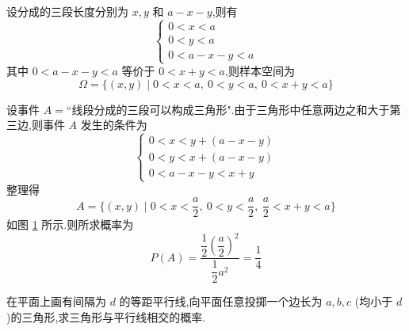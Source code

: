 \begin{solution}
    设分成的三段长度分别为 $x, y$ 和 $a-x-y$,则有
    $$
    \begin{cases}
        0<x<a \\
        0<y<a \\
        0 < a-x-y < a
    \end{cases}
    $$
    其中 $0 < a-x-y < a$ 等价于 $0 < x+y < a$,则样本空间为
    $$
    \varOmega = \{ (x,y) \mid 0<x<a,\ 0<y<a,\ 0 < x+y < a \}
    $$

    设事件 $A = \text{``线段分成的三段可以构成三角形"}$.由于三角形中任意两边之和大于第三边,则事件 $A$ 发生的条件为
    $$
    \begin{cases}
        0 < x < y + (a-x-y) \\
        0 < y < x + (a-x-y) \\
        0 < a-x-y < x+y
    \end{cases}
    $$
    整理得
    $$
    A = \{ (x,y) \mid 0 < x < \dfrac{a}{2},\ 0 < y < \dfrac{a}{2},\ \dfrac{a}{2} < x+y < a \}
    $$
    如图 \ref{fig:example-三角形} 所示.则所求概率为
    $$
    P(A) = \dfrac{\dfrac{1}{2} \left( \dfrac{a}{2} \right)^2}{\dfrac{1}{2} a^2} = \dfrac{1}{4}
    $$

    \begin{figure}[H]
        \centering

        
        \caption{}
        \label{fig:example-三角形}
    \end{figure}
\end{solution}

\question 在平面上画有间隔为 $d$ 的等距平行线,向平面任意投掷一个边长为 $a, b, c$ (均小于 $d$)的三角形,求三角形与平行线相交的概率.

